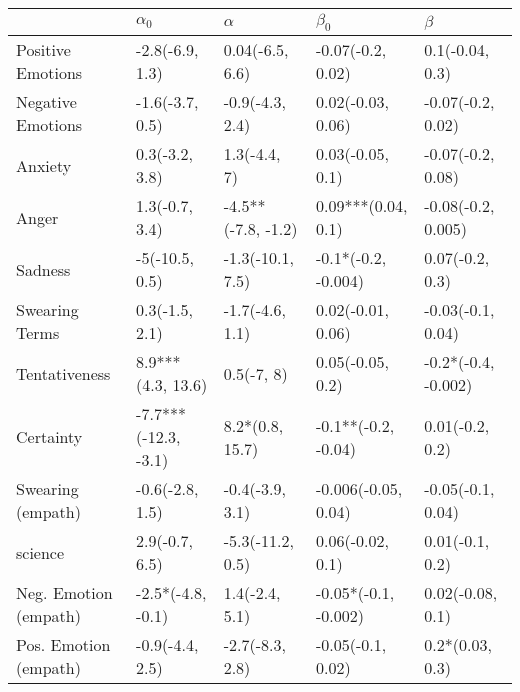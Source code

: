 \begin{tabular}{lllll}
\toprule
{} &            $\alpha_0$ &            $\alpha$ &             $\beta_0$ &              $\beta$ \\
\midrule
Positive Emotions     &       -2.8(-6.9, 1.3) &     0.04(-6.5, 6.6) &     -0.07(-0.2, 0.02) &      0.1(-0.04, 0.3) \\
Negative Emotions     &       -1.6(-3.7, 0.5) &     -0.9(-4.3, 2.4) &     0.02(-0.03, 0.06) &    -0.07(-0.2, 0.02) \\
Anxiety               &        0.3(-3.2, 3.8) &        1.3(-4.4, 7) &      0.03(-0.05, 0.1) &    -0.07(-0.2, 0.08) \\
Anger                 &        1.3(-0.7, 3.4) &  -4.5**(-7.8, -1.2) &    0.09***(0.04, 0.1) &   -0.08(-0.2, 0.005) \\
Sadness               &        -5(-10.5, 0.5) &    -1.3(-10.1, 7.5) &   -0.1*(-0.2, -0.004) &      0.07(-0.2, 0.3) \\
Swearing Terms        &        0.3(-1.5, 2.1) &     -1.7(-4.6, 1.1) &     0.02(-0.01, 0.06) &    -0.03(-0.1, 0.04) \\
Tentativeness         &     8.9***(4.3, 13.6) &          0.5(-7, 8) &      0.05(-0.05, 0.2) &  -0.2*(-0.4, -0.002) \\
Certainty             &  -7.7***(-12.3, -3.1) &     8.2*(0.8, 15.7) &   -0.1**(-0.2, -0.04) &      0.01(-0.2, 0.2) \\
Swearing (empath)     &       -0.6(-2.8, 1.5) &     -0.4(-3.9, 3.1) &   -0.006(-0.05, 0.04) &    -0.05(-0.1, 0.04) \\
science               &        2.9(-0.7, 6.5) &    -5.3(-11.2, 0.5) &      0.06(-0.02, 0.1) &      0.01(-0.1, 0.2) \\
Neg. Emotion (empath) &     -2.5*(-4.8, -0.1) &      1.4(-2.4, 5.1) &  -0.05*(-0.1, -0.002) &     0.02(-0.08, 0.1) \\
Pos. Emotion (empath) &       -0.9(-4.4, 2.5) &     -2.7(-8.3, 2.8) &     -0.05(-0.1, 0.02) &      0.2*(0.03, 0.3) \\
\bottomrule
\end{tabular}
